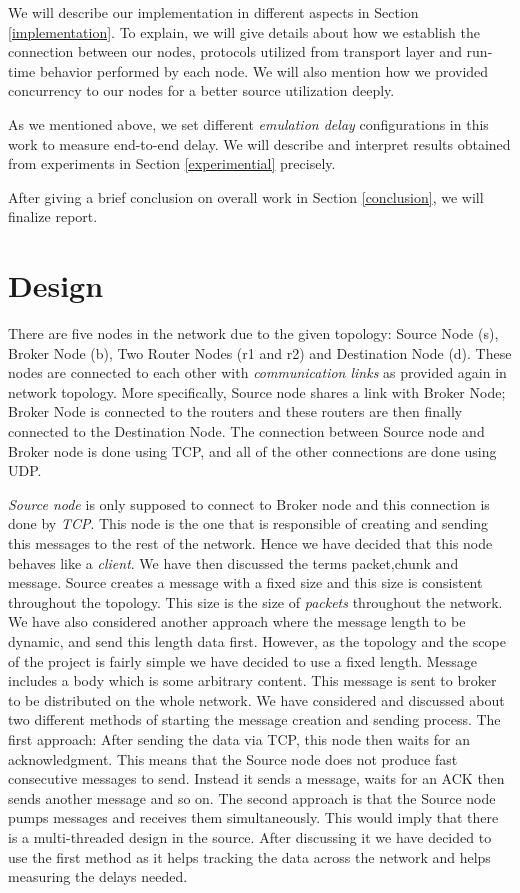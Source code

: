 \documentclass[conference]{IEEEtran}
\begin{document}
\par We will describe our implementation in different aspects in
Section \ref{implementation}. To explain, we will give details about how we establish the
connection between our nodes, protocols utilized from transport layer and run-time behavior performed by each node. We will also mention how we provided concurrency to our nodes for a better source utilization deeply.

\par As we mentioned above, we set different \textit{emulation delay} configurations in this work to measure end-to-end delay. We will describe and interpret results obtained from experiments in Section \ref{experimential} precisely. 

\par After giving a brief conclusion on overall work in Section \ref{conclusion}, we will finalize report. 

\section{Design} \label{design}
\par There are five nodes in the network due to the given topology: Source Node (s), Broker Node (b), Two Router Nodes (r1 and r2) and Destination Node (d). These nodes are connected to each other with \textit{communication links} as provided again in network topology. More specifically, Source node shares a link with Broker Node; Broker Node is connected to the routers and these routers are then finally connected to the Destination Node. The connection between Source node and Broker node is done using TCP, and all of the other connections are done using UDP. 
\par \textit{Source node} is only supposed to connect to Broker node and this connection is done by \textit{TCP}. This node is the one that is responsible of creating and sending this messages to the rest of the network. Hence we have decided that this node behaves like a \textit{client}. We have then discussed the terms packet,chunk and message. Source creates a message with a fixed size and this size is consistent throughout the topology. This size is the size of \textit{packets} throughout the network. We have also considered another approach where the message length to be dynamic, and send this length data first. However, as the topology and the scope of the project is fairly simple we have decided to use a fixed length. Message includes a body which is some arbitrary content. This message is sent to broker to be distributed on the whole network. We have considered and discussed about two different methods of starting the message creation and sending process. The first approach: After sending the data via TCP, this node then waits for an acknowledgment. This means that the Source node does not produce fast consecutive messages to send. Instead it sends a message, waits for an ACK then sends another message and so on. The second approach is that the Source node pumps messages and receives them simultaneously. This would imply that there is a multi-threaded design in the source. After discussing it we have decided to use the first method as it helps tracking the data across the network and helps measuring the delays needed. 
\end{document}

